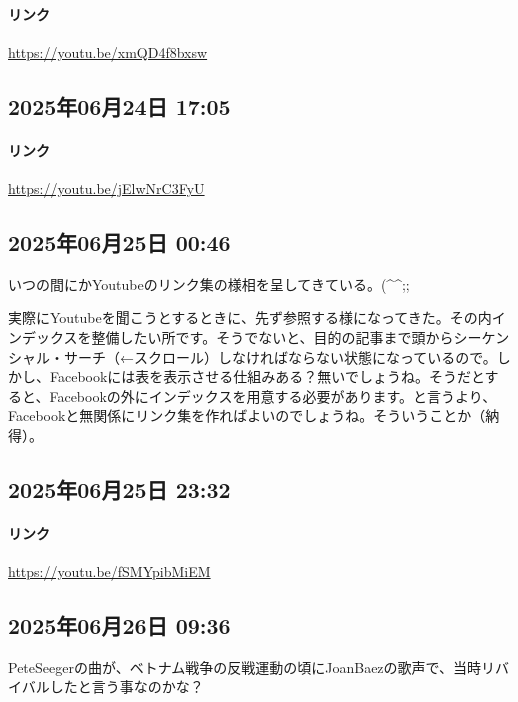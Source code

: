 \paragraph{リンク}
\url{https://youtu.be/xmQD4f8bxsw}

\subsection*{2025年06月24日 17:05}

\paragraph{リンク}
\url{https://youtu.be/jElwNrC3FyU}

\subsection*{2025年06月25日 00:46}

いつの間にかYoutubeのリンク集の様相を呈してきている。(\textasciicircum{}\textasciicircum{};;

実際にYoutubeを聞こうとするときに、先ず参照する様になってきた。その内インデックスを整備したい所です。そうでないと、目的の記事まで頭からシーケンシャル・サーチ（←スクロール）しなければならない状態になっているので。しかし、Facebookには表を表示させる仕組みある？無いでしょうね。そうだとすると、Facebookの外にインデックスを用意する必要があります。と言うより、Facebookと無関係にリンク集を作ればよいのでしょうね。そういうことか（納得）。

\subsection*{2025年06月25日 23:32}

\paragraph{リンク}
\url{https://youtu.be/fSMYpibMiEM}

\subsection*{2025年06月26日 09:36}

PeteSeegerの曲が、ベトナム戦争の反戦運動の頃にJoanBaezの歌声で、当時リバイバルしたと言う事なのかな？

